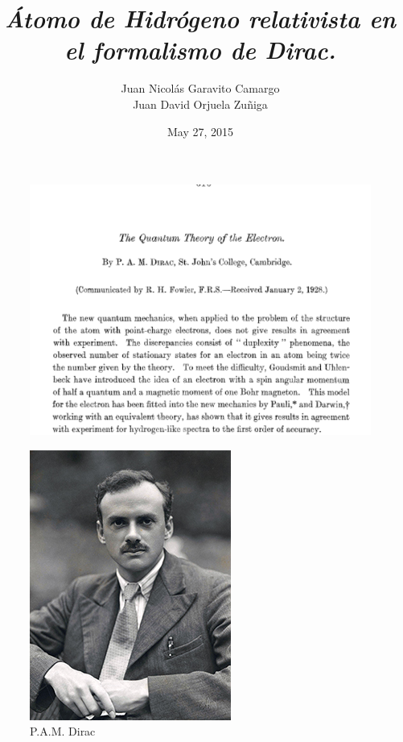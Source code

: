 \documentclass{beamer}
\title{\textit{\textbf{\'Atomo de Hidr\'ogeno relativista en el formalismo de Dirac.}}}
\author{Juan Nicol\'as Garavito Camargo \\ Juan David Orjuela Zu\~niga}
\institute{Universidad de los Andes, Bogot\'a, Colombia}
\date{May 27, 2015}
\begin{document}


\begin{frame}
\begin{figure}
\includegraphics[scale=0.4]{Figures/dirac1928.png}
\end{figure}
\end{frame}


\begin{frame}
\begin{figure}
\includegraphics[scale=0.5]{Figures/dirac.jpg}
\caption{P.A.M. Dirac}
\end{figure}
\end{frame}
\end{document}
